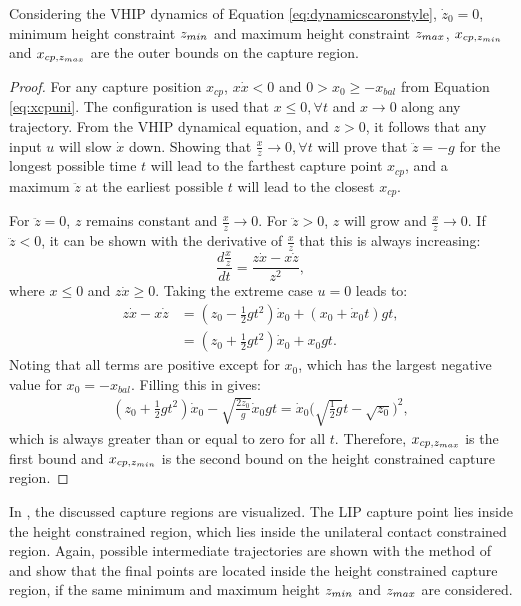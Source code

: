 \begin{lem}\label{lem:regionz}
Considering the \ac{VHIP} dynamics of Equation \eqref{eq:dynamicscaronstyle}, $\dot{z}_0=0$, minimum height constraint $z_{min}$ and maximum height constraint $z_{max}$, $x_{cp,z_{min}}$ and $x_{cp,z_{max}}$ are the outer bounds on the capture region.
\end{lem}
\begin{proof}
For any capture position $x_{cp}$, $x\dot{x}<0$ \cite{koolen2016balance} and $0>x_0\geq-x_{bal}$ from Equation \eqref{eq:xcpuni}. 
The configuration is used that $x \leq 0, \forall t$ and $x\rightarrow 0$ along any trajectory. From the \ac{VHIP} dynamical equation, and $z>0$, it follows that any input $u$ will slow $\dot{x}$ down. Showing that $\frac{x}{z}\rightarrow 0, \forall t$ will prove that $\ddot{z}=-g$ for the longest possible time $t$ will lead to the farthest capture point $x_{cp}$, and a maximum $\ddot{z}$ at the earliest possible $t$ will lead to the closest $x_{cp}$. 

For $\ddot{z}=0$, $z$ remains constant and $\frac{x}{z}\rightarrow 0$. For $\ddot{z}>0$, $z$ will grow and $\frac{x}{z}\rightarrow 0$. If $\ddot{z}<0$, it can be shown with the derivative of $\frac{x}{z}$ that this is always increasing:
\begin{equation}
\frac{d\frac{x}{z}}{dt}= \frac{z\dot{x}-x\dot{z}}{z^2},
\end{equation}
where $x \leq 0$ and $z \dot{x} \geq 0$. Taking the extreme case $u=0$ leads to:
\begin{align}
	z\dot{x}-x\dot{z} &= (z_0 - \frac{1}{2}gt^2)\dot{x}_0 + (x_0 + \dot{x}_0 t)gt,\\
	&= (z_0 +\frac{1}{2}gt^2)\dot{x}_0 + x_0gt.
\end{align}
Noting that all terms are positive except for $x_0$, which has the largest negative value for $x_0=-x_{bal}$. Filling this in gives:
\begin{align}
	(z_0 +\frac{1}{2}gt^2)\dot{x}_0 - \sqrt{\frac{2z_0}{g}}\dot{x}_0gt = \dot{x}_0\bigg(\sqrt{\frac{1}{2}g}t - \sqrt{z_0}\bigg)^2,
\end{align}
which is always greater than or equal to zero for all $t$. Therefore, $x_{cp,z_{max}}$ is the first bound and $x_{cp,z_{min}}$ is the second bound on the height constrained capture region.
\end{proof}
In , the discussed capture regions are visualized. The LIP capture point lies inside the height constrained region, which lies inside the unilateral contact constrained region. Again, possible intermediate trajectories are shown with the method of \cite{koolen2016balance} and show that the final points are located inside the height constrained capture region, if the same minimum and maximum height $z_{min}$ and $z_{max}$ are considered.
